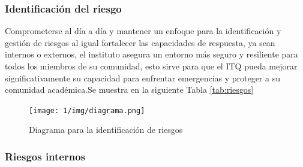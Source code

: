     \subsubsection{Identificación del riesgo}
    Comprometerse al día a día y mantener un enfoque para la identificación y gestión de riesgos al igual fortalecer las capacidades de respuesta, ya sean internos o externos, el instituto asegura un entorno más seguro y resiliente para todos los miembros de su comunidad, esto sirve para que el ITQ pueda mejorar significativamente su capacidad para enfrentar emergencias y proteger a su comunidad académica.Se muestra en la siguiente Tabla \ref{tab:riesgos}
    \begin{figure}[H]
        \centering
        \texttt{[image: 1/img/diagrama.png]}
        \caption{Diagrama para la identificación de riesgos}
        \label{fig:diagrama}
    \end{figure}
    \subsubsection{Riesgos internos}
    
